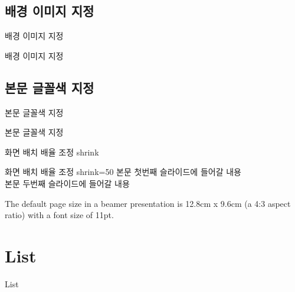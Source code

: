 \documentclass[10pt,blue,xcolor=pdftex,dvipsnames,table,handout]{beamer}
\begin{document}
		\subsection{배경 이미지 지정}
		\begin{frame}[shrink=0]{배경 이미지 지정}

			\begin{block} {배경 이미지 지정}
			\end{block}
		\end{frame}


		\subsection{본문 글꼴색 지정}
		\begin{frame}[shrink=0]{본문 글꼴색 지정}

			\begin{block} {본문 글꼴색 지정}
			\end{block}
		\end{frame}






		\begin{frame}[shrink=50]{화면 배치 배율 조정 shrink}
			
			\begin{block} {화면 배치 배율 조정 shrink=50}
			본문 첫번째 슬라이드에 들어갈 내용\\
			본문 두번째 슬라이드에 들어갈 내용
			\end{block}

			The default page size in a beamer presentation is 12.8cm x 9.6cm (a 4:3 aspect ratio) with a font size of 11pt.

		\end{frame}



		\section{List}

		\begin{frame}[plain]
			\alert{List}

		\end{frame}
\end{document}
